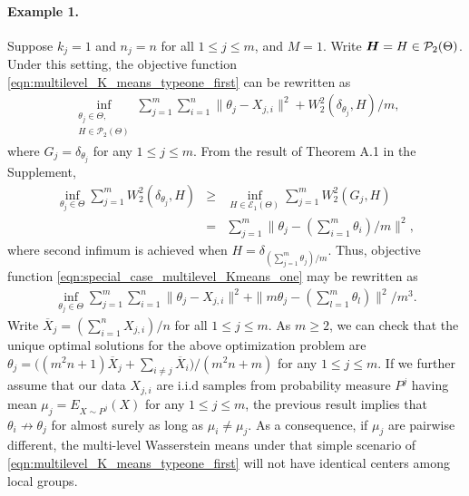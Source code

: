 \paragraph{Example 1.} Suppose $k_{j}=1$ and $n_{j}=n$ for all $1 \leq j \leq m$, and $M=1$. Write
$\boldsymbol{H} = H \in \mathcal{P}_2(\Theta)$. Under 
this setting, the objective function \eqref{eqn:multilevel_K_means_typeone_first} can be 
rewritten as
\begin{eqnarray}
\mathop {\inf }\limits_{\substack {\theta_{j} \in \Theta, \\ H \in \mathcal{P}_{2}(\Theta)}}{\sum \limits_{j=1}^{m}{\sum \limits_{i=1}^{n}{\|\theta_{j}-X_{j,i}\|^{2}}}}
+W_{2}^{2}(\delta_{\theta_{j}},H)/m, \label{eqn:special_case_multilevel_Kmeans_one} 
\end{eqnarray}
where $G_{j}=\delta_{\theta_{j}}$ for any $1 \leq j \leq m$. From the result of Theorem 
A.1 in the Supplement, %
\vspace{-6pt}
\begin{eqnarray}
\mathop {\inf } \limits_{\theta_{j} \in \Theta}{\sum \limits_{j=1}^{m}{W_{2}^{2}(\delta_{\theta_{j}},H)}} & \geq & \mathop {\inf }\limits_{H \in \mathcal{E}_{1}(\Theta)}{\sum \limits_{j=1}^{m}{W_{2}^{2}(G_{j},H)}} \nonumber \\
& = & \sum \limits_{j=1}^{m}{\|\theta_{j}-(\sum \limits_{i=1}^{m}{\theta_{i}})/m\|^{2}}, \nonumber
\end{eqnarray}
where second infimum is achieved when $H=\delta_{(\sum \limits_{j=1}^{m}{\theta_{j}})/m}$. 
Thus, objective function \eqref{eqn:special_case_multilevel_Kmeans_one} may
be rewritten as
\vspace{-6pt}
\begin{eqnarray}
\mathop {\inf }\limits_{\theta_{j} \in \Theta}{\sum \limits_{j=1}^{m}{\sum \limits_{i=1}^{n}{\|\theta_{j}-X_{j,i}\|^{2}}}} +\| m\theta_{j}-(\sum \limits_{l=1}^{m}{\theta_{l}})\|^{2}/m^{3}. \nonumber
\end{eqnarray}
Write $\overline{X}_{j}=(\sum \limits_{i=1}^{n}{X_{j,i}})/n$ for all $1 \leq j \leq m$. 
As $m \geq 2$, we can check that the unique optimal solutions for the above optimization 
problem are $\theta_{j}=\biggr((m^2n+1)\overline{X}_{j}+\sum \limits_{i \neq j}
{\overline{X}_{i}}\biggr)/(m^{2}n+m)$ for any $1 \leq j \leq m$. If we further assume that 
our data $X_{j,i}$ are i.i.d samples from probability measure $P^{j}$ having mean $\mu_{j}
=E_{X \sim P^{j}}(X)$ for any $1 \leq j \leq m$, the previous result implies that $\theta_{i} 
\not \to \theta_{j}$ for almost surely as long as $\mu_{i} \neq \mu_{j}$. As a 
consequence, if $\mu_{j}$ are pairwise different, the multi-level Wasserstein means under 
that simple scenario of \eqref{eqn:multilevel_K_means_typeone_first} will not have identical 
centers among local groups. 

